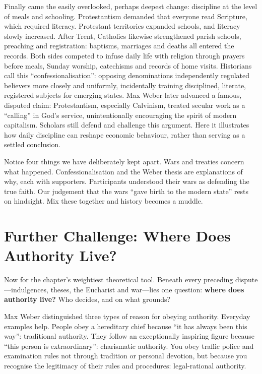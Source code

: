 Finally came the easily overlooked, perhaps deepest change: discipline at the level of meals and schooling. Protestantism demanded that everyone read Scripture, which required literacy. Protestant territories expanded schools, and literacy slowly increased. After Trent, Catholics likewise strengthened parish schools, preaching and registration: baptisms, marriages and deaths all entered the records. Both sides competed to infuse daily life with religion through prayers before meals, Sunday worship, catechisms and records of home visits. Historians call this ``confessionalisation'': opposing denominations independently regulated believers more closely and uniformly, incidentally training disciplined, literate, registered subjects for emerging states. Max Weber later advanced a famous, disputed claim: Protestantism, especially Calvinism, treated secular work as a ``calling'' in God's service, unintentionally encouraging the spirit of modern capitalism. Scholars still defend and challenge this argument. Here it illustrates how daily discipline can reshape economic behaviour, rather than serving as a settled conclusion.

Notice four things we have deliberately kept apart. Wars and treaties concern what happened. Confessionalisation and the Weber thesis are explanations of why, each with supporters. Participants understood their wars as defending the true faith. Our judgement that the wars ``gave birth to the modern state'' rests on hindsight. Mix these together and history becomes a muddle.

\section[Further Challenge: Where Authority Lives]{Further Challenge: Where Does Authority Live?}
Now for the chapter's weightiest theoretical tool. Beneath every preceding dispute---indulgences, theses, the Eucharist and war---lies one question: \textbf{where does authority live?} Who decides, and on what grounds?

Max Weber distinguished three types of reason for obeying authority. Everyday examples help. People obey a hereditary chief because ``it has always been this way'': traditional authority. They follow an exceptionally inspiring figure because ``this person is extraordinary'': charismatic authority. You obey traffic police and examination rules not through tradition or personal devotion, but because you recognise the legitimacy of their rules and procedures: legal-rational authority.

